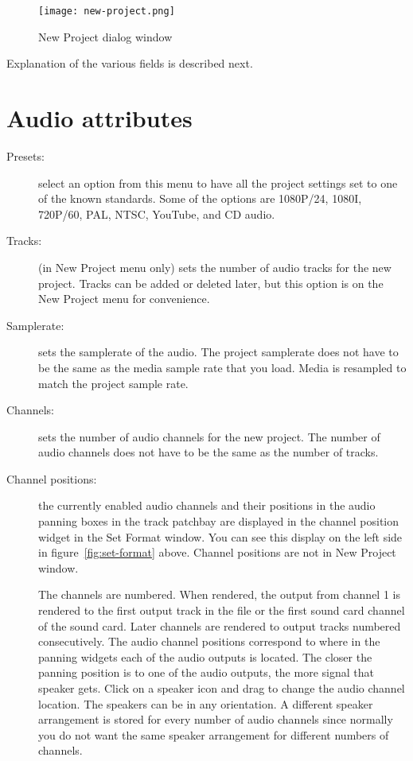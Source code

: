 \begin{figure}[htpb] \centering
\texttt{[image: new-project.png]}
  \caption{New Project dialog window}
  \label{fig:new-project}
\end{figure}

Explanation of the various fields is described next.

\section{Audio attributes}%
\label{sec:audio_attributes}


\begin{description}
\item[Presets:] select an option from this menu to have all the
project settings set to one of the known standards.  Some of the
options are 1080P/24, 1080I, 720P/60, PAL, NTSC, YouTube, and CD
audio.

\item[Tracks:] (in New Project menu only) sets the number of audio
tracks for the new project. Tracks can be added or deleted later,
but this option is on the New Project menu for convenience.

\item[Samplerate:] sets the samplerate of the audio. The project
samplerate does not have to be the same as the media sample rate
that you load. Media is resampled to match the project sample rate.

\item[Channels:] sets the number of audio channels for the new
project. The number of audio channels does not have to be the same
as the number of tracks.

\item[Channel positions:] the currently enabled audio channels and
their positions in the audio panning boxes in the track patchbay are
displayed in the channel position widget in the Set Format window.
You can see this display on the left side in
figure~\ref{fig:set-format} above.  Channel positions are not in New
Project window.

  The channels are numbered.  When rendered, the output from channel
1 is rendered to the first output track in the file or the first
sound card channel of the sound card.  Later channels are rendered
to output tracks numbered consecutively.  The audio channel
positions correspond to where in the panning widgets each of the
audio outputs is located.  The closer the panning position is to one
of the audio outputs, the more signal that speaker gets.  Click on a
speaker icon and drag to change the audio channel location.  The
speakers can be in any orientation.  A different speaker arrangement
is stored for every number of audio channels since normally you do
not want the same speaker arrangement for different numbers of
channels.


\end{description}
